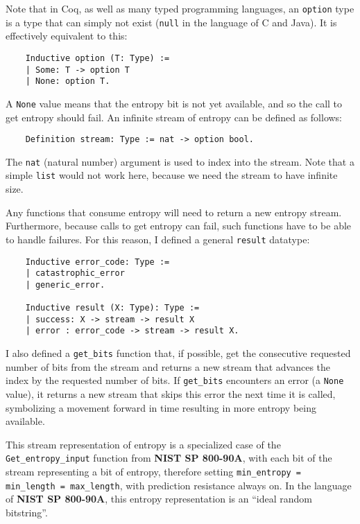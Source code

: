 \documentclass[pageno]{jpaper}
\newcommand{\stdtitle}[1]{\textbf{#1}}
\begin{document}
Note that in Coq, as well as many typed programming languages, an \lstinline{option} type is a type that can simply not exist (\lstinline{null} in the language of C and Java). It is effectively equivalent to this:

\begin{lstlisting}
    Inductive option (T: Type) :=
    | Some: T -> option T
    | None: option T.
\end{lstlisting}

A \lstinline{None} value means that the entropy bit is not yet available, and so the call to get entropy should fail. An infinite stream of entropy can be defined as follows:

\begin{lstlisting}
    Definition stream: Type := nat -> option bool.
\end{lstlisting}

The \lstinline{nat} (natural number) argument is used to index into the stream. Note that a simple \lstinline{list} would not work here, because we need the stream to have infinite size.

Any functions that consume entropy will need to return a new entropy stream. Furthermore, because calls to get entropy can fail, such functions have to be able to handle failures. For this reason, I defined a general \lstinline{result} datatype:

\begin{lstlisting}
    Inductive error_code: Type :=
    | catastrophic_error
    | generic_error.

    Inductive result (X: Type): Type :=
    | success: X -> stream -> result X
    | error : error_code -> stream -> result X.
\end{lstlisting}

I also defined a \lstinline{get_bits} function that, if possible, get the consecutive requested number of bits from the stream and returns a new stream that advances the index by the requested number of bits. If \lstinline{get_bits} encounters an error (a \lstinline{None} value), it returns a new stream that skips this error the next time it is called, symbolizing a movement forward in time resulting in more entropy being available.

This stream representation of entropy is a specialized case of the \lstinline{Get_entropy_input} function from \stdtitle{NIST SP 800-90A}, with each bit of the stream representing a bit of entropy, therefore setting \lstinline{min_entropy = min_length = max_length}, with prediction resistance always on. In the language of \stdtitle{NIST SP 800-90A}, this entropy representation is an “ideal random bitstring”.
\end{document}
